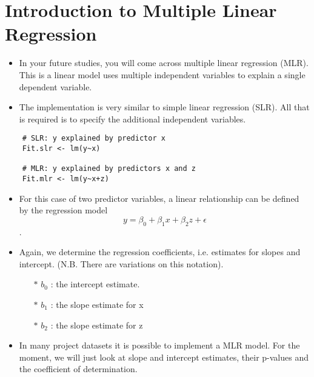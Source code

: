\documentclass[a4paper,12pt]{article}
\begin{document}
\Large

\section{Introduction to Multiple Linear Regression}
\begin{itemize}
\item In your future studies, you will come across multiple linear regression (MLR). This is a linear model uses multiple independent variables to explain a single dependent variable.

\item The implementation is very similar to simple linear regression (SLR). All that is required is to specify the additional independent variables.

\end{itemize}

\begin{framed}
	\begin{verbatim}
	# SLR: y explained by predictor x
	Fit.slr <- lm(y~x)    
	
	# MLR: y explained by predictors x and z
	Fit.mlr <- lm(y~x+z)  
	\end{verbatim}
\end{framed}

\begin{itemize}
\item For this case of two predictor variables, a  linear relationship can be defined by the regression model  \[y =\beta_0 + \beta_1x + \beta_2z + \epsilon\].

\item Again, we determine the regression coefficients, i.e. estimates for slopes and intercept. (N.B. There are variations on this notation).
\begin{itemize}
	\item[$\ast$]	$b_0$ : the intercept estimate.
	\item[$\ast$]	$b_1$  : the slope estimate for x
	\item[$\ast$]	$b_2$  : the slope estimate for z
\end{itemize}






\item In many project datasets it is possible to implement a MLR model. For the moment, we will just look at slope and intercept estimates, their p-values and the coefficient of determination.
\end{itemize}
\newpage
\end{document}

